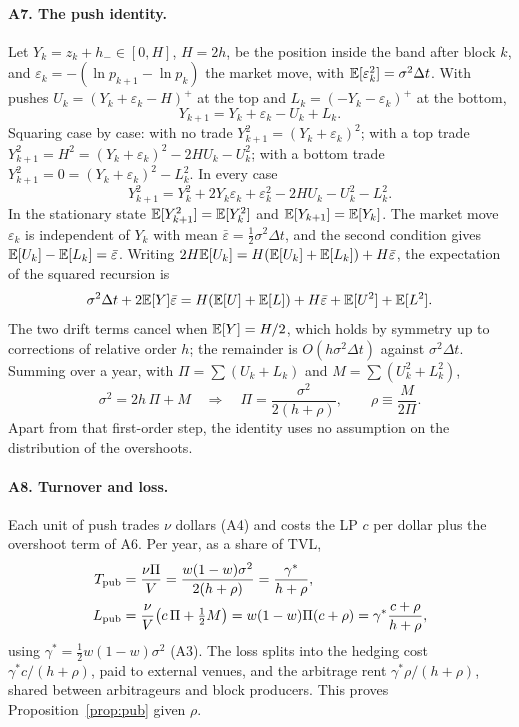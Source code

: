 \paragraph{A7. The push identity.} Let $Y_k=z_k+h_-\in[0,H]$, $H=2h$, be the position inside the band after block $k$, and $\varepsilon_k=-(\ln p_{k+1}-\ln p_k)$ the market move, with $\mathbb{E}[\varepsilon_k^2]=\sigma^2\Delta t$. With pushes $U_k=(Y_k+\varepsilon_k-H)^+$ at the top and $L_k=(-Y_k-\varepsilon_k)^+$ at the bottom,
\begin{equation}
Y_{k+1}=Y_k+\varepsilon_k-U_k+L_k .
\end{equation}
Squaring case by case: with no trade $Y_{k+1}^2=(Y_k+\varepsilon_k)^2$; with a top trade $Y_{k+1}^2=H^2=(Y_k+\varepsilon_k)^2-2HU_k-U_k^2$; with a bottom trade $Y_{k+1}^2=0=(Y_k+\varepsilon_k)^2-L_k^2$. In every case
\begin{equation}
Y_{k+1}^2=Y_k^2+2Y_k\varepsilon_k+\varepsilon_k^2-2HU_k-U_k^2-L_k^2 .
\end{equation}
In the stationary state $\mathbb{E}[Y_{k+1}^2]=\mathbb{E}[Y_k^2]$ and $\mathbb{E}[Y_{k+1}]=\mathbb{E}[Y_k]$. The market move $\varepsilon_k$ is independent of $Y_k$ with mean $\bar\varepsilon=\tfrac12\sigma^2\Delta t$, and the second condition gives $\mathbb{E}[U_k]-\mathbb{E}[L_k]=\bar\varepsilon$. Writing $2H\mathbb{E}[U_k]=H(\mathbb{E}[U_k]+\mathbb{E}[L_k])+H\bar\varepsilon$, the expectation of the squared recursion is
\begin{equation}
\sigma^2\Delta t+2\mathbb{E}[Y]\bar\varepsilon=H(\mathbb{E}[U]+\mathbb{E}[L])+H\bar\varepsilon+\mathbb{E}[U^2]+\mathbb{E}[L^2].
\end{equation}
The two drift terms cancel when $\mathbb{E}[Y]=H/2$, which holds by symmetry up to corrections of relative order $h$; the remainder is $O(h\sigma^2\Delta t)$ against $\sigma^2\Delta t$. Summing over a year, with $\Pi=\sum(U_k+L_k)$ and $M=\sum(U_k^2+L_k^2)$,
\begin{equation}
\sigma^2=2h\,\Pi+M\quad\Longrightarrow\quad \Pi=\frac{\sigma^2}{2(h+\rho)},\qquad \rho\equiv\frac{M}{2\Pi}.
\end{equation}
Apart from that first-order step, the identity uses no assumption on the distribution of the overshoots.

\paragraph{A8. Turnover and loss.} Each unit of push trades $\nu$ dollars (A4) and costs the LP $c$ per dollar plus the overshoot term of A6. Per year, as a share of TVL,
\begin{align}
T_{\mathrm{pub}}&=\frac{\nu\Pi}{V}=\frac{w(1-w)\sigma^2}{2(h+\rho)}=\frac{\gamma^{*}}{h+\rho},\\
L_{\mathrm{pub}}&=\frac{\nu}{V}\big(c\,\Pi+\tfrac12M\big)=w(1-w)\Pi(c+\rho)=\gamma^{*}\frac{c+\rho}{h+\rho},
\end{align}
using $\gamma^{*}=\tfrac12w(1-w)\sigma^2$ (A3). The loss splits into the hedging cost $\gamma^{*}c/(h+\rho)$, paid to external venues, and the arbitrage rent $\gamma^{*}\rho/(h+\rho)$, shared between arbitrageurs and block producers. This proves Proposition~\ref{prop:pub} given $\rho$.

